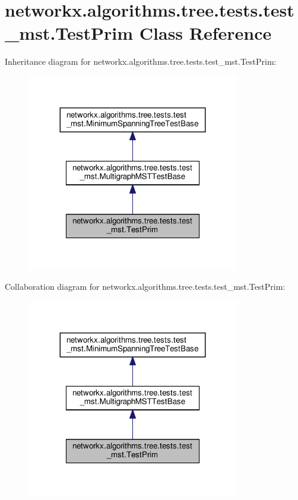 \hypertarget{classnetworkx_1_1algorithms_1_1tree_1_1tests_1_1test__mst_1_1TestPrim}{}\section{networkx.\+algorithms.\+tree.\+tests.\+test\+\_\+mst.\+Test\+Prim Class Reference}
\label{classnetworkx_1_1algorithms_1_1tree_1_1tests_1_1test__mst_1_1TestPrim}


Inheritance diagram for networkx.\+algorithms.\+tree.\+tests.\+test\+\_\+mst.\+Test\+Prim\+:
\nopagebreak
\begin{figure}[H]
\begin{center}
\leavevmode
\includegraphics[width=263pt]{classnetworkx_1_1algorithms_1_1tree_1_1tests_1_1test__mst_1_1TestPrim__inherit__graph}
\end{center}
\end{figure}


Collaboration diagram for networkx.\+algorithms.\+tree.\+tests.\+test\+\_\+mst.\+Test\+Prim\+:
\nopagebreak
\begin{figure}[H]
\begin{center}
\leavevmode
\includegraphics[width=263pt]{classnetworkx_1_1algorithms_1_1tree_1_1tests_1_1test__mst_1_1TestPrim__coll__graph}
\end{center}
\end{figure}

